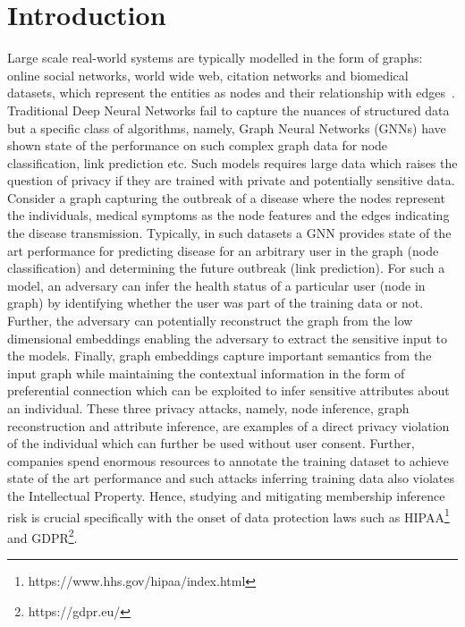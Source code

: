 \section{Introduction}\label{introduction}

Large scale real-world systems are typically modelled in the form of graphs: online social networks, world wide web, citation networks and biomedical datasets, which represent the entities as nodes and their relationship with edges~\cite{zhou2018graph}.
Traditional Deep Neural Networks fail to capture the nuances of structured data but a specific class of algorithms, namely, Graph Neural Networks (GNNs) have shown state of the performance on such complex graph data for node classification, link prediction etc.
Such models requires large data which raises the question of privacy if they are trained with private and potentially sensitive data.
Consider a graph capturing the outbreak of a disease where the nodes represent the individuals, medical symptoms as the node features and the edges indicating the disease transmission.
Typically, in such datasets a GNN provides state of the art performance for predicting disease for an arbitrary user in the graph (node classification) and determining the future outbreak (link prediction).
For such a model, an adversary can infer the health status of a particular user (node in graph) by identifying whether the user was part of the training data or not.
Further, the adversary can potentially reconstruct the graph from the low dimensional embeddings enabling the adversary to extract the sensitive input to the models.
Finally, graph embeddings capture important semantics from the input graph while maintaining the contextual information in the form of preferential connection which can be exploited to infer sensitive attributes about an individual.
These three privacy attacks, namely, node inference, graph reconstruction and attribute inference, are examples of a direct privacy violation of the individual which can further be used without user consent. %
Further, companies spend enormous resources to annotate the training dataset to achieve state of the art performance and such attacks inferring training data also violates the Intellectual Property.
Hence, studying and mitigating membership inference risk is crucial specifically with the onset of data protection laws such as HIPAA\footnote{https://www.hhs.gov/hipaa/index.html} and GDPR\footnote{https://gdpr.eu/}.

